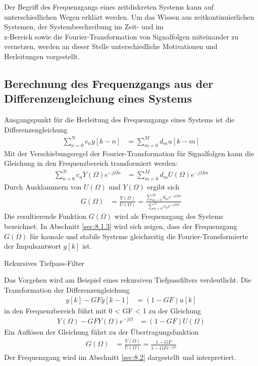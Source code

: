 Der Begriff des Frequenzgangs eines zeitdiskreten Systems kann auf unterschiedlichen Wegen erklärt werden. Um das Wissen aus zeitkontinuierlichen Systemen, der Systembeschreibung im Zeit- und im\\
z-Bereich sowie die Fourier-Transformation von Signalfolgen miteinander zu vernetzen, werden an dieser Stelle unterschiedliche Motivationen und Herleitungen vorgestellt.

\subsection{Berechnung des Frequenzgangs aus der Differenzengleichung eines Systems}\label{sec:8.1.1}

Ausgangspunkt für die Herleitung des Frequenzgangs eines Systems ist die Differenzengleichung
\begin{align}
\sum\limits_{n = 0}^{N}{c_{n}  y[ k - n]} &= \sum\limits_{m = 0}^{M}{d_{m}  u[ k - m]} \label{eq:8.1}
\end{align}
Mit der Verschiebungsregel der Fourier-Transformation für Signalfolgen kann die Gleichung in den Frequenzbereich transformiert werden:
\begin{align}
\sum\limits_{n = 0}^{N}{c_{n}  Y(\Omega)  e^{- j  \Omega  n}} &= \sum\limits_{m = 0}^{M}{d_{m}  U(\Omega)  e^{- j  \Omega  m}} \label{eq:8.2}
\end{align}
Durch Ausklammern von \(U(Ω)\) und \(Y(Ω)\) ergibt sich
\begin{align}
G(\Omega) &= \frac{Y(\Omega)}{U(\Omega)} = \frac{\sum\limits_{m = 0}^{M}{d_{m}  e^{- j  \Omega  m}}}{\sum\limits_{n = 0}^{N}{c_{n}  e^{- j  \Omega  n}}} \label{eq:8.3}
\end{align}
Die resultierende Funktion \(G(Ω)\) wird als Frequenzgang des Systems bezeichnet. In Abschnitt \ref{sec:8.1.3} wird sich zeigen, dass der Frequenzgang \(G(Ω)\) für kausale und stabile Systeme gleichzeitig die Fourier-Transformierte der Impulsantwort \(g[k]\) ist.

\begin{example}{Rekursives Tiefpass-Filter}
\label{example:beispiel-rekursives-tiefpass-filter}

Das Vorgehen wird am Beispiel eines rekursiven Tiefpassfilters verdeutlicht. Die Transformation der Differenzengleichung
\begin{align*}
y[ k] - GF  y[ k - 1] &= (1 - GF)  u[ k] 
\end{align*}
in den Frequenzbereich führt mit 0 \textless{} GF \textless{} 1 zu der Gleichung
\begin{align*}
Y(\Omega) - GF  Y(\Omega)  e^{- j  \Omega} &= (1 - GF)  U(\Omega) 
\end{align*}
Ein Auflösen der Gleichung führt zu der Übertragungsfunktion
\begin{align*}
G(\Omega) &= \frac{Y(\Omega)}{U(\Omega)} = \frac{1 - GF}{1 - GF  e^{- j  \Omega}} 
\end{align*}
Der Frequenzgang wird im Abschnitt \ref{sec:8.2} dargestellt und interpretiert.

\end{example}

